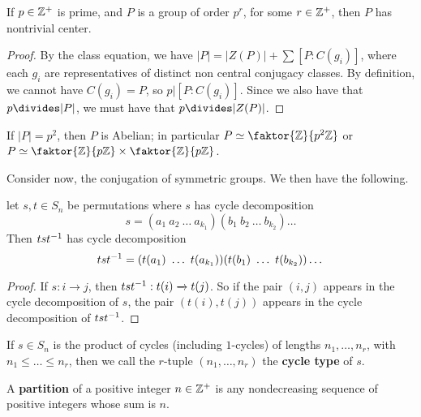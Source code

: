 \begin{theorem}\label{theorem_4.3.3}
  If $p \in \mathbb{Z}^+$ is prime, and $P$ is a group of order $p^r$, for some  $r
  \in \mathbb{Z}^+$, then $P$ has nontrivial center.
\end{theorem}
\begin{proof}
  By the class equation, we have $|P|=|Z(P)|+\sum{[P:C(g_i)]}$, where
  each $g_i$ are representatives of distinct non central conjugacy classes. By
  definition, we cannot have $C(g_i)=P$, so $p|[P:C(g_i)]$. Since we also have
  that $p \divides |P|$, we must have that $p \divides |Z(P)|$.
\end{proof}
\begin{corollary}
  If $|P|=p^2$, then $P$ is Abelian; in particular  $P \simeq
  \faktor{\Z}{p^2\Z}$ or $P \simeq \faktor{\Z}{p\Z} \times \faktor{\Z}{p\Z}$.
\end{corollary}

Consider now, the conjugation of symmetric groups. We then have the following.

\begin{proposition}\label{proposition_4.3.4}
  let $s,t \in S_n$ be permutations where $s$ has cycle decomposition
  \begin{equation*}
    s=(a_1 \ a_2 \ \dots \ a_{k_1})(b_1 \ b_2 \ \dots \ b_{k_2})\dots
  \end{equation*}
  Then $tst^{-1}$ has cycle decomposition
  \begin{equation*}
    ts\inv{t}=(t(a_1) \ \dots \ t(a_{k_1}))(t(b_1) \ \dots \ t(b_{k_2}))\dots
  \end{equation*}
\end{proposition}
\begin{proof}
  If $s:i \xrightarrow{} j$, then $tst^{-1}:t(i) \xrightarrow{} t(j)$. So if
  the pair $(i,j)$ appears in the cycle decomposition of $s$, the pair
  $(t(i),t(j))$ appears in the cycle decomposition of $tst^{-1}$.
\end{proof}

\begin{definition}
  If $s \in S_n$ is the product of cycles (including $1$-cycles) of lengths
  $n_1, \dots, n_r$, with $n_1 \leq \dots \leq n_r$, then we call the $r$-tuple
  $(n_1, \dots, n_r)$ the \textbf{cycle type} of $s$.
\end{definition}

\begin{definition}
  A \textbf{partition} of a positive integer $n \in \mathbb{Z}^+$ is any nondecreasing
  sequence of positive integers whose sum is $n$.
\end{definition}


